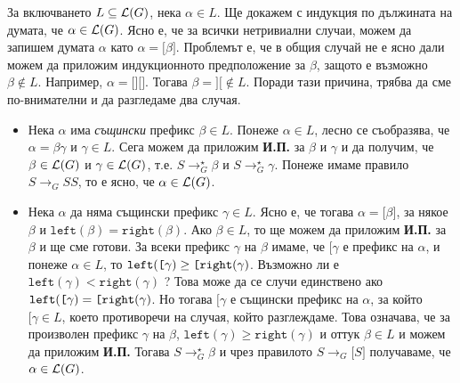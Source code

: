 \begin{hint}
  За включването $L \subseteq \mathcal{L}(G)$, нека $\alpha \in L$.
  Ще докажем с индукция по дължината на думата, че $\alpha \in \mathcal{L}(G)$.
  Ясно е, че за всички нетривиални случаи, можем да запишем думата $\alpha$ като $\alpha = \texttt{[}\beta\texttt{]}$.
  Проблемът е, че в общия случай не е ясно дали можем да приложим индукционното предположение за $\beta$,
  защото е възможно $\beta \not\in L$. Например, $\alpha = \texttt{[][]}$.
  Тогава $\beta = \texttt{][} \not \in L$.
  Поради тази причина, трябва да сме по-внимателни и да разгледаме два случая.
  \begin{itemize}
  \item 
    Нека $\alpha$ има {\em същински} префикс $\beta \in L$.
    Понеже $\alpha \in L$, лесно се съобразява, че $\alpha = \beta\gamma$ и $\gamma \in L$.
    Сега можем да приложим {\bf И.П.} за $\beta$ и $\gamma$ и да получим, че 
    $\beta \in \mathcal{L}(G)$ и $\gamma \in \mathcal{L}(G)$, т.е.
    $S \to^\star_G \beta$ и $S \to^\star_G \gamma$.
    Понеже имаме правило $S \to_G SS$, то е ясно, че $\alpha \in \mathcal{L}(G)$.
  \item
    Нека $\alpha$ да няма същински префикс $\gamma \in L$.
    Ясно е, че тогава $\alpha = \texttt{[}\beta\texttt{]}$, за някое $\beta$
    и $\texttt{left}(\beta) = \texttt{right}(\beta)$. 
    Ако $\beta \in L$, то ще можем да приложим {\bf И.П.} за $\beta$ и ще сме готови.
    За всеки префикс $\gamma$ на $\beta$ имаме, че $\texttt{[}\gamma$ е префикс на $\alpha$,
    и понеже $\alpha \in L$, то $\texttt{left}(\texttt{[}\gamma) \geq \texttt{\texttt{[}right}(\gamma)$.
    Възможно ли е $\texttt{left}(\gamma) < \texttt{right}(\gamma)$ ?
    Това може да се случи единствено ако $\texttt{left}(\texttt{[}\gamma) = \texttt{\texttt{[}right}(\gamma)$.
    Но тогава $\texttt{[}\gamma$ е същински префикс на $\alpha$, за който $\texttt{[}\gamma \in L$,
    което противоречи на случая, който разглеждаме.
    Това означава, че за произволен префикс $\gamma$ на $\beta$,
    $\texttt{left}(\gamma) \geq \texttt{right}(\gamma)$ и оттук $\beta \in L$ и можем да приложим {\bf И.П.}
    Тогава $S \to^\star_G \beta$ и чрез правилото $S \to_G \texttt{[}S\texttt{]}$
    получаваме, че $\alpha \in \mathcal{L}(G)$.    
  \end{itemize}
\end{hint}

